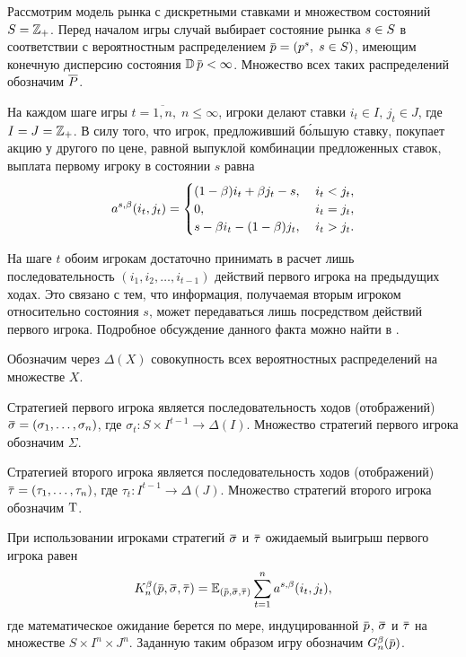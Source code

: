 {Рассмотрим модель рынка с дискретными ставками и множеством состояний $S = \mathbb{Z}_+$.
Перед началом игры случай выбирает состояние рынка $s \in S$ в соответствии с вероятностным распределением $\p = (p^s, \; s \in S)$, имеющим конечную дисперсию состояния $\D \p < \infty$.
Множество всех таких распределений обозначим $\overline{P}$.

На каждом шаге игры $t = \overline{1,n}, \; n \leqslant \infty$, игроки делают ставки $i_t \in I, \, j_t \in J$, где $I = J = \mathbb{Z}_+$.
В силу того, что игрок, предложивший б\'{о}льшую ставку, покупает акцию у другого по цене, равной выпуклой комбинации предложенных ставок, выплата первому игроку в состоянии $s$ равна
\begin{equation*}
  a^{s,\beta}(i_t, j_t) =
  \begin{cases}
    (1-\beta) i_t + \beta j_t - s, &\; i_t < j_t, \\
    0, &\; i_t = j_t, \\
    s - \beta i_t - (1-\beta)j_t, &\; i_t > j_t.
  \end{cases}
\end{equation*}

На шаге $t$ обоим игрокам достаточно принимать в расчет лишь последовательность $(i_1, i_2, \ldots, i_{t-1})$ действий первого игрока на предыдущих ходах.
Это связано с тем, что информация, получаемая вторым игроком относительно состояния $s$, может передаваться лишь посредством действий первого игрока.
Подробное обсуждение данного факта можно найти в \cite{mertens15}.

Обозначим через $\Delta(X)$ совокупность всех вероятностных распределений на множестве $X$.

Стратегией первого игрока является последовательность ходов (отображений) $\sigmav = (\sigma_1, \ldots, \sigma_n)$, где $\sigma_t: S \times I^{t-1} \rightarrow \Delta(I)$.
Множество стратегий первого игрока обозначим $\Sigma$.

Стратегией второго игрока является последовательность ходов (отображений) $\tauv = (\tau_1, \ldots, \tau_n)$, где $\tau_t: I^{t-1} \rightarrow \Delta(J)$.
Множество стратегий второго игрока обозначим $\mathrm{T}$.

При использовании игроками стратегий $\sigmav$ и $\tauv$ ожидаемый выигрыш первого игрока равен
\begin{equation*}
  \K(\p, \sigmav, \tauv) =
  \E_{(\p, \sigmav, \tauv)} \sum_{t=1}^n \as(i_t, j_t),
\end{equation*}
где математическое ожидание берется по мере, индуцированной $\p$, $\sigmav$ и $\tauv$ на множестве $S \times I^n \times J^n$.
Заданную таким образом игру обозначим $\theG(\p)$.

}
